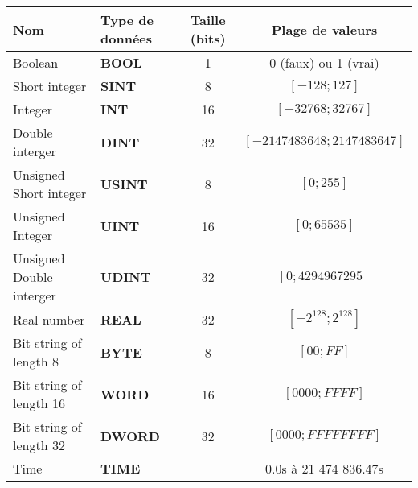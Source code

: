 \begin{tabular}{llcc}
\textbf{Nom} & \textbf{Type de données} & \textbf{Taille (bits)} & \textbf{Plage de valeurs}\\\hline
Boolean        & \textbf{BOOL}   & 1   &  0 (faux) ou 1 (vrai) \\\hline\hline%
%
Short integer  & \textbf{SINT}   & 8   &  $[-128 ; 127]$ \\\hline
Integer        & \textbf{INT}    & 16  &  $[-32768 ; 32767]$ \\\hline
Double interger& \textbf{DINT}   & 32  &  $[-2 147 483 648 ; 2 147 483 647]$ \\\hline\hline%
%
Unsigned Short integer  & \textbf{USINT}   & 8   &  $[0 ; 255]$ \\\hline
Unsigned Integer        & \textbf{UINT}    & 16  &  $[0 ; 65535]$ \\\hline
Unsigned Double interger& \textbf{UDINT}   & 32  &  $[0 ; 4294967295]$ \\\hline\hline%
%
Real number  & \textbf{REAL}   &  32   & $[-2^128 ; 2^128]$  \\\hline\hline%
%
Bit string of length 8  & \textbf{BYTE}   &   8  &  $[00 ; FF]$ \\\hline
Bit string of length 16  & \textbf{WORD}   &   16  &  $[0000 ; FFFF]$ \\\hline
Bit string of length 32  & \textbf{DWORD}   &   32  &  $[0000 ; FFFFFFFF]$ \\\hline\hline%
%
Time & \textbf{TIME} & & 0.0s à 21 474 836.47s \\
\end{tabular}
